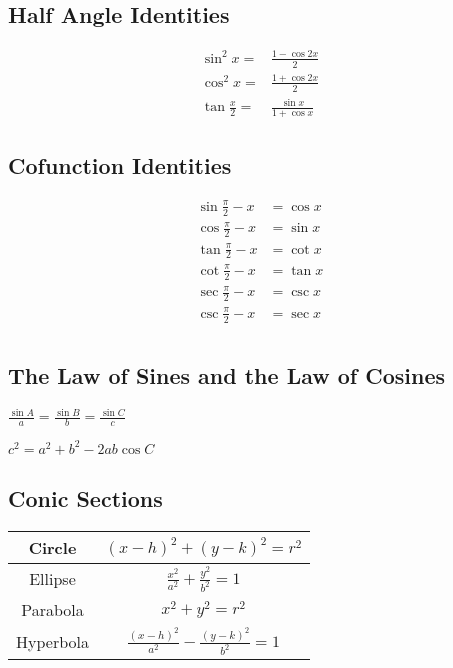 \begin{multicols}{2}
\subsection{Half Angle Identities}
\begin{align*}
\sin^{2}{x}=&\frac{1-\cos{2x}}{2}\\
\cos^{2}{x}=&\frac{1+\cos{2x}}{2}\\
\tan{\frac{x}{2}}=&\frac{\sin{x}}{1+\cos{x}}
\end{align*}

\subsection{Cofunction Identities}
\begin{align*}
\sin{\frac{\pi}{2} - x}&=\cos{x}\\
\cos{\frac{\pi}{2} - x}&=\sin{x}\\
\tan{\frac{\pi}{2} - x}&=\cot{x}\\
\cot{\frac{\pi}{2} - x}&=\tan{x}\\
\sec{\frac{\pi}{2} - x}&=\csc{x}\\
\csc{\frac{\pi}{2} - x}&=\sec{x}\\
\end{align*}

\subsection{The Law of Sines and the Law of Cosines}
$\displaystyle{\frac{\sin{A}}{a} = \frac{\sin{B}}{b} = \frac{\sin{C}}{c}}$

$c^{2} = a^{2} + b^{2} - 2ab\cos{C}$

\end{multicols}

\subsection{Conic Sections}

\begin{tabular}{c|c}
Circle & $(x-h)^{2} + (y-k)^{2} = r^{2}$\\ \hline
Ellipse & $\frac{x^{2}}{a^{2}} + \frac{y^{2}}{b^{2}} = 1$\\ \hline
Parabola & $x^{2} + y^{2} = r^{2}$\\ \hline
Hyperbola & $\frac{(x-h)^{2}}{a^{2}} - \frac{(y-k)^{2}}{b^{2}} = 1$
\end{tabular}

\pagebreak





